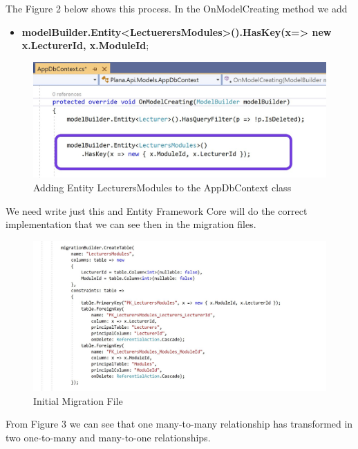 \documentclass{scrartcl}
\begin{document}
The Figure 2 below shows this process. In the OnModelCreating method we add
\begin{itemize}
\item\textbf{modelBuilder.Entity<LectuerersModules>().HasKey(x=> new {x.LecturerId, x.ModuleId}};
\end{itemize}


 





\begin{figure}[H]
\centering
\includegraphics[width=150mm]{report_img/many-to-many.JPG}
\caption{Adding Entity LecturersModules to the AppDbContext class}
\label{blabla}
\end{figure}  
We need write just this and Entity Framework Core will do the correct implementation that we can see then in the migration files. \cite{patrick}

\begin{figure}[H]
\centering
\includegraphics[width=150mm]{report_img/Initial.JPG}
\caption{Initial Migration File}
\label{blabla}
\end{figure} 

From Figure 3 we can see that one many-to-many relationship has transformed in two one-to-many and many-to-one relationships.
\end{document}
